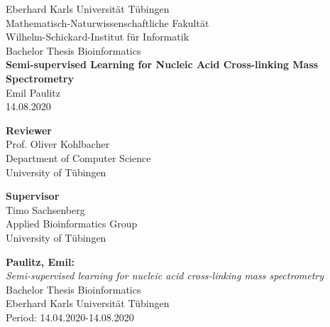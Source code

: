\documentclass[twoside,12pt,a4paper]{report}
\begin{document}
 
\begin{titlepage}
 \begin{center}
  {\LARGE Eberhard Karls Universit\"at T\"ubingen}\\
  {\large Mathematisch-Naturwissenschaftliche Fakultät \\
Wilhelm-Schickard-Institut f\"ur Informatik\\[4cm]}
  {\huge Bachelor Thesis Bioinformatics\\[2cm]}
  {\Large\bf  Semi-supervised Learning for Nucleic Acid Cross-linking Mass Spectrometry\\[1.5cm]}
 {\large Emil Paulitz}\\[0.5cm]
14.08.2020\\[3cm]
\begin{center}
{\small\bf Reviewer}\\[0.5cm]
 {\large Prof. Oliver Kohlbacher}\\
  {\footnotesize Department of Computer Science\\
	University of T\"ubingen}
  \end{center}
	
\begin{center}
{\small\bf Supervisor}\\[0.5cm]
  {\large Timo Sachsenberg}\\
  {\footnotesize Applied Bioinformatics Group\\
	University of T\"ubingen}\end{center}

  \end{center}
\end{titlepage}

\thispagestyle{empty}
\vspace*{\fill}
\begin{minipage}{11.2cm}
\textbf{Paulitz, Emil:}\\
\emph{Semi-supervised learning for nucleic acid cross-linking mass spectrometry}\\ Bachelor Thesis Bioinformatics\\
Eberhard Karls Universit\"at T\"ubingen\\
Period: 14.04.2020-14.08.2020
\end{minipage}
\newpage
\end{document}
